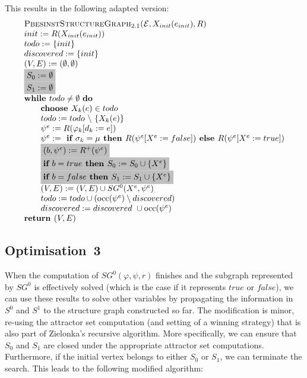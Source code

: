 \documentclass{article}
\newcommand{\Return}{\text{\textbf{return }}}
\begin{document}
This results in the following adapted version:
\begin{equation*}
\begin{array}{l}
\textsc{PbesinstStructureGraph$_{2.1}$(}\mathcal{E}, X_{init}(e_{init}), R) \\ 
init:=R(X_{init}(e_{init})) \\
todo:=\{init\} \\
discovered:=\{init\} \\
(V,E) :=(\emptyset ,\emptyset ) \\ 
\colorbox{lightgray}{$%
S_0:= \emptyset $}\\
\colorbox{lightgray}{$%
S_1:= \emptyset $}\\
\text{\textbf{while }}todo\neq \emptyset \text{ \textbf{do}} \\ 
\qquad \text{\textbf{choose }}X_{k}(e)\in todo \\ 
\qquad todo:=todo\ \backslash \ \{X_{k}(e)\} \\ 
\qquad \psi ^{e}:=R(\varphi _{k}[d_{k}:=e]) \\ 
\qquad \psi^e := \textbf{ if } \sigma_k = \mu \textbf{ then } R(\psi^e[X^e := false])
\textbf{ else }  R(\psi^e[X^e := true]) \\
\qquad \colorbox{lightgray}{$%
(b,\psi^e) := R^+(\psi^e) $}\\
\qquad \colorbox{lightgray}{$%
\textbf{if $b = true$ then } S_0 := S_0 \cup \{ X^e \} $}\\
\qquad \colorbox{lightgray}{$%
\textbf{if $b = false$ then } S_1 := S_1 \cup \{ X^e \} $}\\
\qquad (V,E) := (V,E) \cup SG^{0}(X^{e},\psi ^{e}) \\ 
\qquad todo:=todo\cup (\mathrm{occ}(\psi ^{e})\setminus discovered) \\
\qquad discovered:=discovered\ \cup \mathrm{occ}(\psi ^{e}) \\
\Return (V, E)
\end{array}%
\end{equation*}%

\subsection{Optimisation~3}

When the computation of $SG^0(\varphi,\psi,r)$ finishes and the subgraph represented by $SG^0$ 
is effectively solved (which is the case if it represents $true$ or $false$), we can use these
results to solve other variables by propagating the information in $S^0$ and $S^1$ to
the structure graph constructed so far. The modification is minor, re-using the
attractor set computation (and setting of a winning strategy) that is also part of Zielonka's 
recursive algorithm. More
specifically, we can ensure that $S_0$ and $S_1$ are closed under the appropriate
attractor set computations. Furthermore, if the initial vertex belongs to either
$S_0$ or $S_1$, we can terminate the search. This leads to the following modified algorithm:
\end{document}
